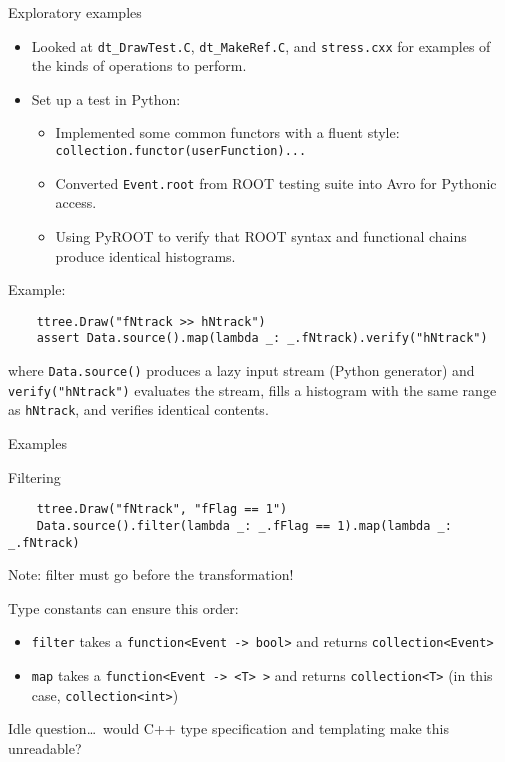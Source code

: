 \documentclass{beamer}
\begin{document}
\begin{frame}[fragile]{Exploratory examples}

\begin{itemize}
\item Looked at {\tt dt\_DrawTest.C}, {\tt dt\_MakeRef.C}, and {\tt stress.cxx} for examples of the kinds of operations to perform.
\item Set up a test in Python:
\begin{itemize}
\item Implemented some common functors with a fluent style: {\tt collection.functor(userFunction)...}
\item Converted {\tt Event.root} from ROOT testing suite into Avro for Pythonic access.
\item Using PyROOT to verify that ROOT syntax and functional chains produce identical histograms.
\end{itemize}
\end{itemize}

\begin{block}{Example:}
\vspace{-0.5\baselineskip}
{\scriptsize \begin{verbatim}
    ttree.Draw("fNtrack >> hNtrack")
    assert Data.source().map(lambda _: _.fNtrack).verify("hNtrack")
\end{verbatim}}

\vspace{-0.5\baselineskip}
where {\tt Data.source()} produces a lazy input stream (Python generator) and {\tt verify("hNtrack")} evaluates the stream, fills a histogram with the same range as {\tt hNtrack}, and verifies identical contents.
\end{block}
\end{frame}

\begin{frame}[fragile]{Examples}
\begin{block}{Filtering}
\vspace{-0.5\baselineskip}
{\scriptsize \begin{verbatim}
    ttree.Draw("fNtrack", "fFlag == 1")
    Data.source().filter(lambda _: _.fFlag == 1).map(lambda _: _.fNtrack)
\end{verbatim}}

Note: filter must go before the transformation!

\vspace{0.2 cm}
Type constants can ensure this order:
\begin{itemize}
\item {\tt filter} takes a {\tt function<Event -> bool>} and returns {\tt collection<Event>}
\item {\tt map} takes a {\tt function<Event -> <T> >} and returns {\tt collection<T>} (in this case, {\tt collection<int>})
\end{itemize}

\vspace{0.2 cm}
Idle question\ldots\ would C++ type specification and templating make this unreadable?
\end{block}
\end{frame}
\end{document}
